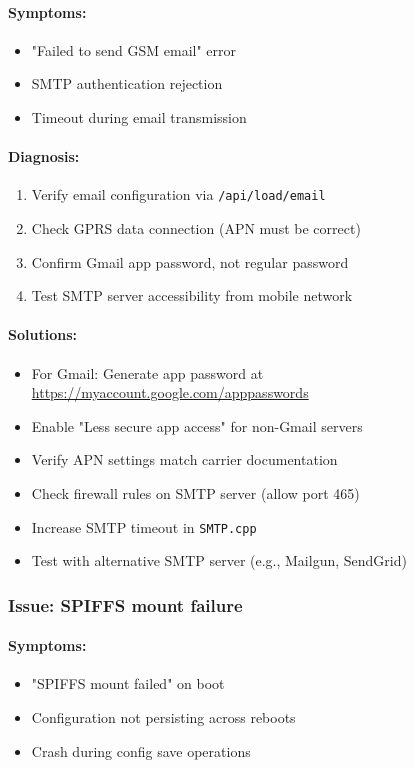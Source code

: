 \documentclass[11pt,a4paper]{article}
\begin{document}
\paragraph{Symptoms:}
\begin{itemize}[leftmargin=*]
  \item "Failed to send GSM email" error
  \item SMTP authentication rejection
  \item Timeout during email transmission
\end{itemize}

\paragraph{Diagnosis:}
\begin{enumerate}[leftmargin=*]
  \item Verify email configuration via \texttt{/api/load/email}
  \item Check GPRS data connection (APN must be correct)
  \item Confirm Gmail app password, not regular password
  \item Test SMTP server accessibility from mobile network
\end{enumerate}

\paragraph{Solutions:}
\begin{itemize}[leftmargin=*]
  \item For Gmail: Generate app password at \url{https://myaccount.google.com/apppasswords}
  \item Enable "Less secure app access" for non-Gmail servers
  \item Verify APN settings match carrier documentation
  \item Check firewall rules on SMTP server (allow port 465)
  \item Increase SMTP timeout in \texttt{SMTP.cpp}
  \item Test with alternative SMTP server (e.g., Mailgun, SendGrid)
\end{itemize}

\subsubsection{Issue: SPIFFS mount failure}

\paragraph{Symptoms:}
\begin{itemize}[leftmargin=*]
  \item "SPIFFS mount failed" on boot
  \item Configuration not persisting across reboots
  \item Crash during config save operations
\end{itemize}
\end{document}
